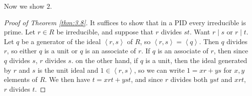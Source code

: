 \documentclass{article}
\newcommand{\ab}[1]{\left\langle #1 \right\rangle}
\theoremstyle{definition}\newtheorem{definition}{Definition}[section]
\theoremstyle{definition}\newtheorem{remark}[definition]{Remark}
\theoremstyle{definition}\newtheorem*{example}{Example}
\theoremstyle{definition}\newtheorem*{note}{Note}
\begin{document}
Now we show $ 2 $.

\begin{proof}[Proof of Theorem \ref{thm:3.8}]
It suffices to show that in a PID every irreducible is prime. Let $ r \in R $ be irreducible, and suppose that $ r $ divides $ st $. Want $ r \mid s $ or $ r \mid t $. Let $ q $ be a generator of the ideal $ \ab{r, s} $ of $ R $, so $ \ab{r, s} = \ab{q} $. Then $ q $ divides $ r $, so either $ q $ is a unit or $ q $ is an associate of $ r $. If $ q $ is an associate of $ r $, then since $ q $ divides $ s $, $ r $ divides $ s $. on the other hand, if $ q $ is a unit, then the ideal generated by $ r $ and $ s $ is the unit ideal and $ 1 \in \ab{r, s} $, so we can write $ 1 = xr + ys $ for $ x, y $ elements of $ R $. We then have $ t = xrt + yst $, and since $ r $ divides both $ yst $ and $ xrt $, $ r $ divides $ t $.
\end{proof}
\end{document}
